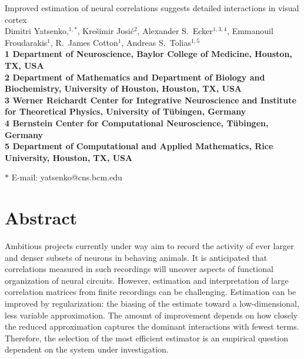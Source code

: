 \documentclass[10pt]{article}
\date{}
\begin{document}
\begin{flushleft}
{\Large
Improved estimation of neural correlations suggests detailed interactions in visual cortex
}
\\
Dimitri Yatsenko,$^{1,\ast}$, 
Kre\v{s}imir Josi\'{c}$^{2}$,
Alexander S.~Ecker$^{1,3,4}$,
Emmanouil Froudarakis$^{1}$,
R.~James Cotton$^{1}$,
Andreas S.~Tolias$^{1,5}$
\\
\bf{1} Department of Neuroscience, Baylor College of Medicine, Houston, TX, USA
\\
\bf{2} Department of Mathematics and Department of Biology and Biochemistry, University of Houston, Houston, TX, USA
\\
\bf{3}  Werner Reichardt Center for Integrative Neuroscience and Institute for Theoretical Physics, University of T\"ubingen, Germany
\\
\bf{4} Bernstein Center for Computational Neuroscience, T\"ubingen, Germany
\\
\bf{5} Department of Computational and Applied Mathematics, Rice University, Houston, TX, USA

$\ast$ E-mail: yatsenko@cns.bcm.edu
\end{flushleft}

\section*{Abstract}
Ambitious projects currently under way aim to record the activity of ever larger and denser subsets of neurons in behaving animals.  It is anticipated that correlations measured in such recordings will uncover aspects of functional organization of neural circuits.  However, estimation and interpretation of large correlation matrices from finite recordings can be challenging.  Estimation can be improved by regularization: the biasing of the estimate toward a low-dimensional, less variable approximation.  The amount of improvement depends on how closely the reduced approximation captures the dominant interactions with fewest terms.  Therefore, the selection of the most efficient estimator is an empirical question dependent on the system under investigation.
\end{document}
